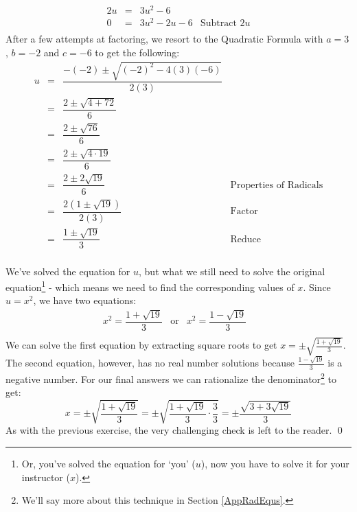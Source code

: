\documentclass{ximera}
\begin{document}
{{{{{\begin{example}
\begin{enumerate}
\[\begin{array}{rclr}
2u & = & 3u^2 - 6 & \\

0 & = & 3u^2 - 2u - 6 & \text{Subtract $2u$} \\

\end{array}\] After a few attempts at factoring, we resort to the Quadratic Formula with $a = 3$, $b = -2$ and $c = -6$ to get the following:\[ \begin{array}{rclr}

u & = & \dfrac{-(-2) \pm \sqrt{(-2)^2 - 4(3)(-6)}}{2(3)} & \\ [10pt]

& = & \dfrac{2 \pm \sqrt{4 + 72}}{6} & \\ [10pt]

& = & \dfrac{2 \pm \sqrt{76}}{6} & \\ [10pt]

& = & \dfrac{2 \pm \sqrt{4 \cdot 19}}{6} & \\ [10pt]

& = & \dfrac{2 \pm 2\sqrt{19}}{6} & \text{Properties of Radicals} \\ [10pt]

& = & \dfrac{2(1 \pm \sqrt{19})}{2(3)} & \text{Factor} \\ [10pt]

& = & \dfrac{1 \pm \sqrt{19}}{3} & \text{Reduce} \\

\end{array} \]

We've solved the equation for $u$, but what we still need to solve the original equation\footnote{Or, you've solved the equation for `you' ($u$), now you have to solve it for your instructor ($x$).} - which means we need to find the corresponding values of $x$.  Since $u = x^2$, we have two equations:\[ \begin{array}{rclr}  

x^2  =\dfrac{1 + \sqrt{19}}{3} & \text{or} & x^2  =\dfrac{1 - \sqrt{19}}{3} & \\

\end{array}\] We can solve the first equation by extracting square roots to get  $x = \pm \sqrt{\frac{1 + \sqrt{19}}{3}}$.  The second equation, however, has no real number solutions because $\frac{1 - \sqrt{19}}{3}$ is a negative number.  For our final answers we can rationalize the denominator\footnote{We'll say more about this technique in Section \ref{AppRadEqus}.} to get: \[ x = \pm \sqrt{\dfrac{1 + \sqrt{19}}{3}} = \pm \sqrt{\dfrac{1 + \sqrt{19}}{3} \cdot \dfrac{3}{3}} = \pm \dfrac{\sqrt{3 + 3\sqrt{19}}}{3} \] As with the previous exercise, the very challenging check is left to the reader. \qed


\end{enumerate}
\end{example}}}}}}
\end{document}
